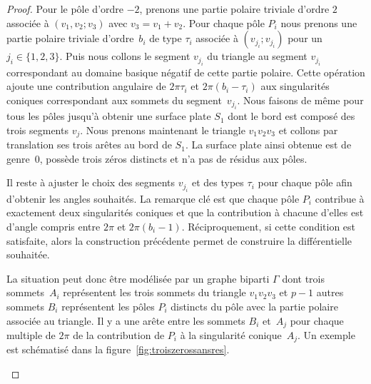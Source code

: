 \documentclass[11pt]{article}
\numberwithin{equation}{section}\renewcommand{\proofname}{Démonstration}
\theoremstyle{definition}
\begin{document}
\begin{proof}
Pour le pôle d'ordre $-2$, prenons une partie polaire triviale d'ordre $2$ associée à $(v_{1},v_{2};v_{3})$ avec $v_{3}=v_{1}+v_{2}$. Pour chaque pôle $P_{i}$ nous prenons une partie polaire triviale d'ordre~$b_{i}$ de type $\tau_{i}$ associée à $(v_{j_{i}};v_{j_{i}})$ pour un $j_{i}\in\lbrace 1,2,3 \rbrace$. Puis nous collons le segment $v_{j_{i}}$ du triangle au segment $v_{j_{i}}$ correspondant au domaine basique négatif de cette partie polaire. Cette opération ajoute une contribution angulaire de $2\pi\tau_{i}$ et $2\pi(b_{i}-\tau_{i})$ aux singularités coniques correspondant aux sommets du segment~$v_{j_{i}}$. Nous faisons de même pour tous les pôles jusqu'à obtenir une surface plate $S_{1}$ dont le bord est composé des trois segments $v_{j}$. Nous prenons maintenant le triangle $v_{1}v_{2}v_{3}$ et collons par translation ses trois arêtes au bord de $S_{1}$.
La surface plate ainsi obtenue est de genre~$0$, possède trois zéros distincts et n'a pas de résidus aux pôles.
\par
Il reste à ajuster le choix des segments $v_{j_{i}}$ et des types $\tau_{i}$ pour chaque pôle afin d'obtenir les angles souhaités. La remarque clé est que chaque pôle $P_{i}$ contribue à exactement deux singularités coniques et que la contribution à chacune d'elles est d'angle compris entre $2\pi$ et $2\pi(b_{i}-1)$. Réciproquement, si cette condition est satisfaite, alors la construction précédente permet de construire la différentielle souhaitée.
\par
La situation peut donc être modélisée par un graphe biparti $\Gamma$ dont trois sommets~$A_{i}$ représentent les trois sommets du triangle $v_{1}v_{2}v_{3}$ et $p-1$ autres sommets $B_{i}$ représentent les pôles $P_{i}$ distincts du pôle avec la partie polaire associée au triangle. Il y a une arête entre les sommets $B_{i}$ et~$A_{j}$ pour chaque multiple de $2\pi$ de la contribution de $P_{i}$ à la singularité conique~$A_{j}$. Un exemple est schématisé dans la figure~\ref{fig:troiszerossansres}.
\begin{figure}[htb]
\center
{}
\end{figure}
\end{proof}
\end{document}
